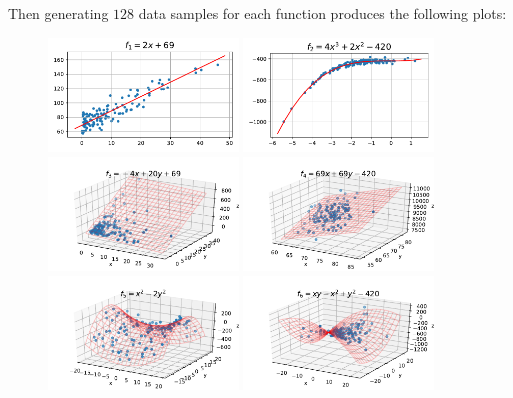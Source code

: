 \documentclass[12pt]{article}
\begin{document}
        Then generating $128$ data samples for each function produces the following plots:
        \begin{figure}[H]
            \centering
            \includegraphics[width=0.45\textwidth, height=0.22\textheight]{f_1_2d.pdf}
            \includegraphics[width=0.45\textwidth, height=0.22\textheight]{f_2_2d.pdf}
            \includegraphics[width=0.45\textwidth, height=0.22\textheight]{f_3_3d.pdf}
            \includegraphics[width=0.45\textwidth, height=0.22\textheight]{f_4_3d.pdf}
            \includegraphics[width=0.45\textwidth, height=0.22\textheight]{f_5_3d.pdf}
            \includegraphics[width=0.45\textwidth, height=0.22\textheight]{f_6_3d.pdf}

\end{figure}
\end{document}
